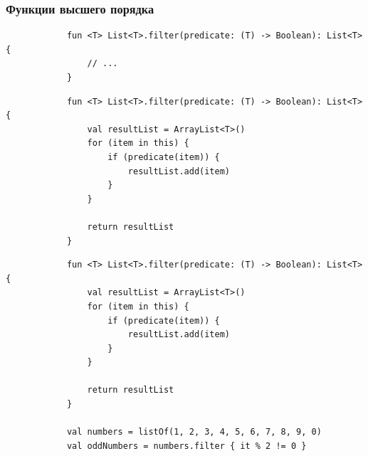\documentclass{beamer}
\begin{document}
\begin{frame}[fragile, t]
    \frametitle{Функции высшего порядка}
    \begin{overprint}
        \begin{verbatim}
            fun <T> List<T>.filter(predicate: (T) -> Boolean): List<T> {
                // ...
            }
        \end{verbatim}

        \begin{verbatim}
            fun <T> List<T>.filter(predicate: (T) -> Boolean): List<T> {
                val resultList = ArrayList<T>()
                for (item in this) {
                    if (predicate(item)) {
                        resultList.add(item)
                    }
                }

                return resultList
            }
        \end{verbatim}

        \begin{verbatim}
            fun <T> List<T>.filter(predicate: (T) -> Boolean): List<T> {
                val resultList = ArrayList<T>()
                for (item in this) {
                    if (predicate(item)) {
                        resultList.add(item)
                    }
                }

                return resultList
            }

            val numbers = listOf(1, 2, 3, 4, 5, 6, 7, 8, 9, 0)
            val oddNumbers = numbers.filter { it % 2 != 0 }
        \end{verbatim}
    \end{overprint}
\end{frame}
\end{document}
